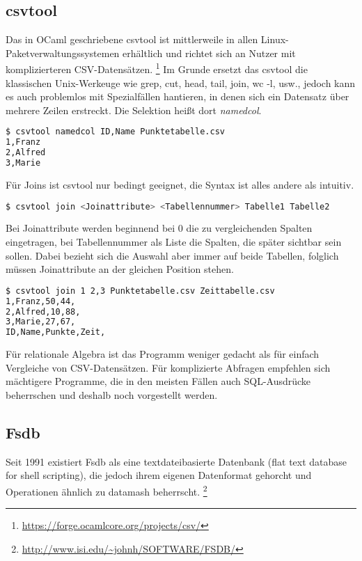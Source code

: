 \subsection{csvtool}
Das in OCaml geschriebene csvtool ist mittlerweile in allen Linux-Pa\-ket\-ver\-wal\-tungs\-sys\-te\-men erhältlich und richtet sich an Nutzer mit komplizierteren CSV-Datensätzen.
\footnote{\url{https://forge.ocamlcore.org/projects/csv/}}
Im Grunde ersetzt das csvtool die klassischen Unix-Werkeuge wie grep, cut, head, tail, join, wc -l, usw., jedoch kann es auch problemlos mit Spezialfällen hantieren, in denen sich ein Datensatz über mehrere Zeilen erstreckt.
Die Selektion heißt dort \textit{namedcol}.
\begin{lstlisting}[language=Bash]
$ csvtool namedcol ID,Name Punktetabelle.csv 
1,Franz
2,Alfred
3,Marie
\end{lstlisting}

Für Joins ist csvtool nur bedingt geeignet, die Syntax ist alles andere als intuitiv.
\begin{lstlisting}[language=Bash]
$ csvtool join <Joinattribute> <Tabellennummer> Tabelle1 Tabelle2
\end{lstlisting}

Bei Joinattribute werden beginnend bei 0 die zu vergleichenden Spalten eingetragen, bei Tabellennummer als Liste die Spalten, die später sichtbar sein sollen. Dabei bezieht sich die Auswahl aber immer auf beide Tabellen, folglich müssen Joinattribute an der gleichen Position stehen.

\begin{lstlisting}[language=Bash]
$ csvtool join 1 2,3 Punktetabelle.csv Zeittabelle.csv 
1,Franz,50,44,
2,Alfred,10,88,
3,Marie,27,67,
ID,Name,Punkte,Zeit,
\end{lstlisting}

Für relationale Algebra ist das Programm weniger gedacht als für einfach Vergleiche von CSV-Datensätzen. Für komplizierte Abfragen empfehlen sich mächtigere Programme, die in den meisten Fällen auch SQL-Ausdrücke beherrschen und deshalb noch vorgestellt werden.

\subsection{Fsdb}
Seit 1991 existiert Fsdb als eine textdateibasierte Datenbank (flat text database for shell scripting), die jedoch ihrem eigenen Datenformat gehorcht und Operationen ähnlich zu datamash beherrscht.
\footnote{\url{http://www.isi.edu/~johnh/SOFTWARE/FSDB/}}

